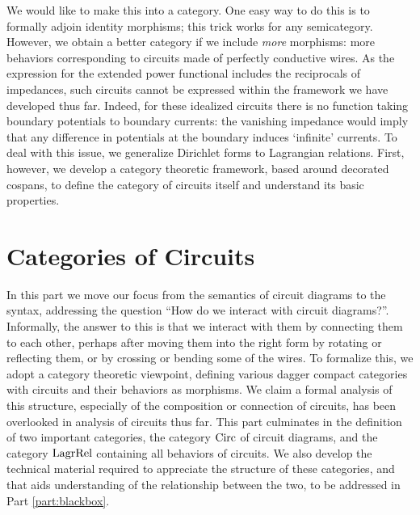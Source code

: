 We would like to make this into a category. One easy way to do this is to
formally adjoin identity morphisms; this trick works for any semicategory.
However, we obtain a better category if we include \emph{more} morphisms: more
behaviors corresponding to circuits made of perfectly conductive wires. As the
expression for the extended power functional includes the reciprocals of
impedances, such circuits cannot be expressed within the framework we have
developed thus far. Indeed, for these idealized circuits there is no function
taking boundary potentials to boundary currents: the vanishing impedance would
imply that any difference in potentials at the boundary induces `infinite'
currents. To deal with this issue, we generalize Dirichlet forms to Lagrangian
relations.  First, however, we develop a category theoretic framework, based
around decorated cospans, to define the category of circuits itself and
understand its basic properties.

\section{Categories of Circuits} \label{part:categories}
In this part we move our focus from the semantics of circuit diagrams to the
syntax, addressing the question ``How do we interact with circuit diagrams?''.
Informally, the answer to this is that we interact with them by connecting them
to each other, perhaps after moving them into the right form by rotating or
reflecting them, or by crossing or bending some of the wires. To formalize this,
we adopt a category theoretic viewpoint, defining various dagger compact
categories with circuits and their behaviors as morphisms. We claim a formal
analysis of this structure, especially of the composition or connection of
circuits, has been overlooked in analysis of circuits thus far. This part
culminates in the definition of two important categories, the category $\mathrm{Circ}$
of circuit diagrams, and the category $\mathrm{LagrRel}$ containing all behaviors of
circuits. We also develop the technical material required to appreciate the
structure of these categories, and that aids understanding of the relationship
between the two, to be addressed in Part \ref{part:blackbox}.

